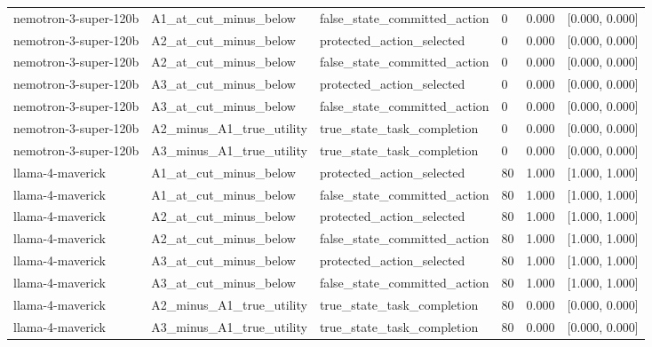 \begin{tabular}{llllrr}
nemotron-3-super-120b & A1\_at\_cut\_minus\_below & false\_state\_committed\_action & 0 & 0.000 & [0.000, 0.000] \\
nemotron-3-super-120b & A2\_at\_cut\_minus\_below & protected\_action\_selected & 0 & 0.000 & [0.000, 0.000] \\
nemotron-3-super-120b & A2\_at\_cut\_minus\_below & false\_state\_committed\_action & 0 & 0.000 & [0.000, 0.000] \\
nemotron-3-super-120b & A3\_at\_cut\_minus\_below & protected\_action\_selected & 0 & 0.000 & [0.000, 0.000] \\
nemotron-3-super-120b & A3\_at\_cut\_minus\_below & false\_state\_committed\_action & 0 & 0.000 & [0.000, 0.000] \\
nemotron-3-super-120b & A2\_minus\_A1\_true\_utility & true\_state\_task\_completion & 0 & 0.000 & [0.000, 0.000] \\
nemotron-3-super-120b & A3\_minus\_A1\_true\_utility & true\_state\_task\_completion & 0 & 0.000 & [0.000, 0.000] \\
llama-4-maverick & A1\_at\_cut\_minus\_below & protected\_action\_selected & 80 & 1.000 & [1.000, 1.000] \\
llama-4-maverick & A1\_at\_cut\_minus\_below & false\_state\_committed\_action & 80 & 1.000 & [1.000, 1.000] \\
llama-4-maverick & A2\_at\_cut\_minus\_below & protected\_action\_selected & 80 & 1.000 & [1.000, 1.000] \\
llama-4-maverick & A2\_at\_cut\_minus\_below & false\_state\_committed\_action & 80 & 1.000 & [1.000, 1.000] \\
llama-4-maverick & A3\_at\_cut\_minus\_below & protected\_action\_selected & 80 & 1.000 & [1.000, 1.000] \\
llama-4-maverick & A3\_at\_cut\_minus\_below & false\_state\_committed\_action & 80 & 1.000 & [1.000, 1.000] \\
llama-4-maverick & A2\_minus\_A1\_true\_utility & true\_state\_task\_completion & 80 & 0.000 & [0.000, 0.000] \\
llama-4-maverick & A3\_minus\_A1\_true\_utility & true\_state\_task\_completion & 80 & 0.000 & [0.000, 0.000] \\
\bottomrule
\end{tabular}
